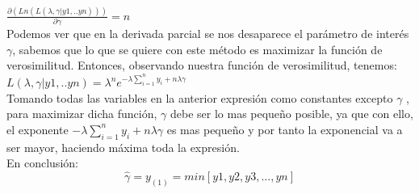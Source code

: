 \documentclass[letterpaper,12pt,onecolumn,titlepage]{article}
\begin{document}
~\\ $\frac{\partial(Ln(L(\lambda,\gamma |y1,..yn)))}{\partial\gamma}= n$
~\\ Podemos ver que en la derivada parcial se nos desaparece el par\'{a}metro de inter\'{e}s $\gamma$, sabemos que lo que se quiere con este m\'{e}todo es maximizar la funci\'{o}n de verosimilitud. Entonces, observando nuestra funci\'{o}n de verosimilitud, tenemos:
~\\ $L(\lambda,\gamma |y1,..yn)=\lambda^n e^{-\lambda\sum\limits_{i=1}^{n}{y_{i}}+n\lambda\gamma}$
~\\ Tomando todas las variables en la anterior expresi\'{o}n como constantes excepto $\gamma$ , para maximizar dicha funci\'{o}n, $\gamma$  debe ser lo mas peque\~{n}o posible, ya que con ello, el exponente $-\lambda\sum\limits_{i=1}^{n}{y_{i}}+n\lambda\gamma$ es mas peque\~{n}o y por tanto la exponencial va a ser mayor, haciendo m\'{a}xima toda la expresi\'{o}n.
~\\ En conclusi\'{o}n:
$$\hat{\gamma}=y_(1)= min[y1,y2,y3,...,yn]$$
 
\end{document}
